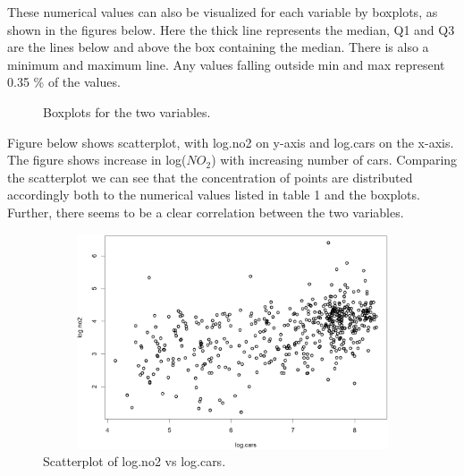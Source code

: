 \documentclass[a4paper,12pt]{article}
\begin{document}
These numerical values can also be visualized for each variable by boxplots, as shown in the figures below. Here the thick line represents the median, Q1 and Q3 are the lines below and above the box containing the median. There is also a minimum and maximum line. Any values falling outside min and max represent 0.35 \% of the values.

\begin{figure}[H]
\caption{Boxplots for the two variables.}
\end{figure}



Figure below shows scatterplot, with log.no2 on y-axis and log.cars on the x-axis.  The figure shows increase in log($NO_2$) with increasing number of cars. Comparing the scatterplot we can see that the concentration of points are distributed accordingly both to the numerical values listed in table 1 and the boxplots. Further, there seems to be a clear correlation between the two variables.

\begin{figure}[H]
\centerline{\includegraphics[width=4.5in, height=2.5in]{Scatterplot(A).png}}
\caption{Scatterplot of log.no2 vs log.cars.}
\label{fig}
\end{figure}
\end{document}
